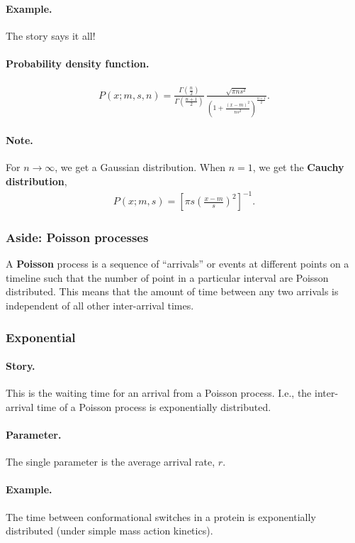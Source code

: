 \paragraph{Example.} The story says it all!
\paragraph{Probability density function.}
\begin{align}
P(x;m, s, n) = \frac{\Gamma\left(\frac{n}{2}\right)}{\Gamma\left(\frac{n+1}{2}\right)}\,
\frac{\sqrt{\pi n s^2}}{\left(1 + \frac{(x-m)^2}{ns^2}\right)^{\frac{n+1}{2}}}.
\end{align}
\paragraph{Note.} For $n\to \infty$, we get a Gaussian distribution.
When $n = 1$, we get the \textbf{Cauchy distribution},
\begin{align}
P(x;m, s) = \left[\pi s \left(\frac{x-m}{s}\right)^2\right]^{-1}.
\end{align}



\subsubsection{Aside: Poisson processes}
A \textbf{Poisson} process is a sequence of ``arrivals'' or events at
different points on a timeline such that the number of point in a
particular interval are Poisson distributed.  This means that the
amount of time between any two arrivals is independent of all other
inter-arrival times.


\subsubsection{Exponential}
\paragraph{Story.} This is the waiting time for an arrival from a
Poisson process.  I.e., the inter-arrival time of a Poisson process is
exponentially distributed.
\paragraph{Parameter.} The single parameter is the average arrival
rate, $r$.
\paragraph{Example.} The time between conformational switches in a
protein is exponentially distributed (under simple mass action
kinetics).
